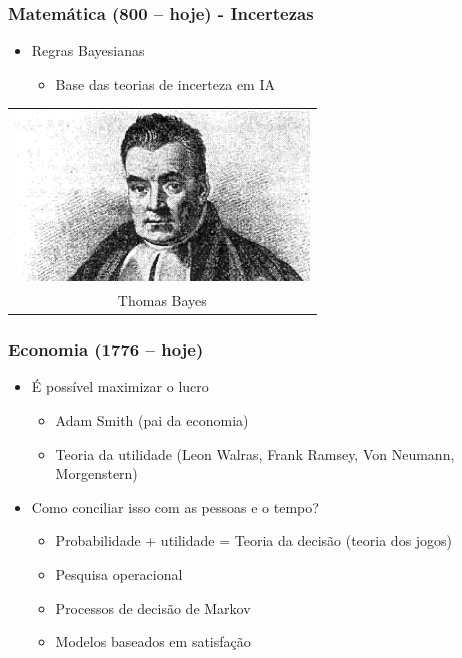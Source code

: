 \documentclass[aspectratio=169]{beamer}
\begin{document}
	\begin{frame}
		\frametitle{Matemática (800 – hoje) - Incertezas}
		\begin{itemize}
			\item Regras Bayesianas
			\begin{itemize}
				\item Base das teorias de incerteza em IA
			\end{itemize}
		\end{itemize}
		
			\begin{table}
				\centering
				\begin{tabular}{c}				
					\includegraphics[height=4.5cm, keepaspectratio]{../figs/cap01/bayes.png} \\
					Thomas Bayes 		
					
				\end{tabular}
			\end{table}
							
	\end{frame}

	\begin{frame}
		\frametitle{Economia (1776 – hoje)}
		\begin{itemize}
			\item É possível maximizar o lucro
			\begin{itemize}
				\item Adam Smith (pai da economia)
				\item Teoria da utilidade (Leon Walras, Frank Ramsey, Von Neumann, Morgenstern)
			\end{itemize}
			\item Como conciliar isso com as pessoas e o tempo?
			\begin{itemize}
				\item Probabilidade + utilidade = Teoria da decisão (teoria dos jogos)
				\item Pesquisa operacional
				\item Processos de decisão de Markov
				\item Modelos baseados em satisfação
			
			\end{itemize}
		\end{itemize}
	\end{frame}
	
\end{document}
